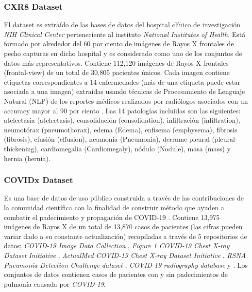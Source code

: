 \subsubsection{CXR8 Dataset}

El dataset es extraído de las bases de datos del hospital clínico de investigación \textit{NIH
Clinical Center} perteneciente al instituto \textit{National Institutes of Health}. Está formado por
alrededor del 60 por ciento de imágenes de Rayos X frontales de pecho capturas en dicho hospital y
es considerado como uno de los conjuntos de datos más representativos. Contiene
112,120 imágenes de Rayos X frontales (frontal-view) de un total de 30,805 pacientes únicos. Cada
imagen contiene etiquetas correspondientes a 14 enfermedades (más de una etiqueta puede estar
asociada a una imagen) extraídas usando técnicas de
Procesamiento de Lenguaje Natural (NLP) de los reportes médicos realizados por radiólogos asociados
con un accuracy mayor al 90 por ciento \cite{8099852}. Las 14 patologías incluidas son las
siguientes: atelectasia (atelectasis), consolidación (consolidation), infiltración (infiltration),
neumotórax (pneumothorax), edema (Edema), enfisema (emphysema), fibrosis (fibrosis),
efusión (effusion), neumonía (Pneumonia),  derrame pleural (pleural-thickening), cardiomegalia (Cardiomegaly),
nódulo (Nodule), masa (mass) y hernia (hernia).

\subsubsection{COVIDx  Dataset}

Es una base de datos de uso público construida a través de las contribuciones de la comunidad
científica con la finalidad de construir método que ayuden a combatir el padecimiento y propagación
de COVID-19 \cite{Wang2020}. Contiene 13,975 imágenes de Rayos X de un total de 13,870 casos de
pacientes (las cifras pueden variar dado a su constante actualización) recopiladas a través de 5
repositorios de datos; \textit{COVID-19 Image Data Collection} \cite{cohen2020covid19},
\textit{Figure 1 COVID-19 Chest X-ray Dataset Initiative} \cite{figure1_2020covid19},
\textit{ActualMed COVID-19 Chest X-ray Dataset Initiative} \cite{actualmed_2020covid19},
\textit{RSNA Pneumonia Detection Challenge dataset} \cite{rsna_det_challlenge},
\textit{COVID-19 radiography database} y \cite{rsna_det_challenge2}. Los conjuntos de datos
contienen casos de pacientes con y sin padecimientos de pulmonía causada por \textit{COVID-19}.

